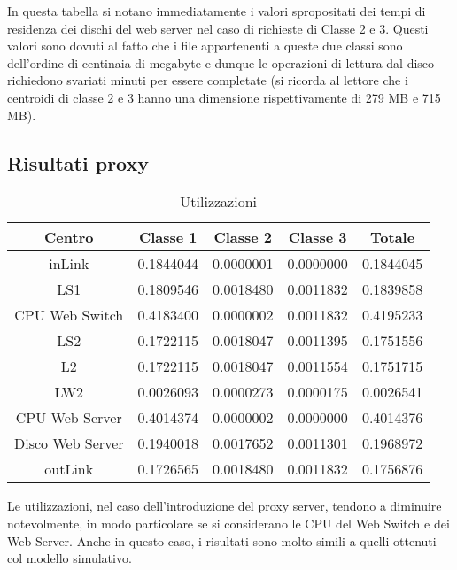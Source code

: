In questa tabella si notano immediatamente i valori spropositati dei tempi di residenza dei dischi del web server nel caso di richieste di Classe 2 e 3. Questi valori sono dovuti al fatto che i file appartenenti a queste due classi sono dell'ordine di centinaia di megabyte e dunque le operazioni di lettura dal disco richiedono svariati minuti per essere completate (si ricorda al lettore che i centroidi di classe 2 e 3 hanno una dimensione rispettivamente di 279 MB e 715 MB).

\subsection{Risultati proxy}
\begin{table}[htbp]
\begin{center}
\begin{tabular}{|c|c|c|c|c|}
\hline
Centro	&Classe 1	&Classe 2	&Classe 3 &Totale\\
\hline
\hline
inLink & 0.1844044 & 0.0000001 & 0.0000000 & 0.1844045 \\ \hline
LS1 & 0.1809546 & 0.0018480 & 0.0011832 & 0.1839858 \\ \hline
CPU Web Switch & 0.4183400 & 0.0000002 & 0.0011832 & 0.4195233 \\ \hline
LS2 & 0.1722115 & 0.0018047 & 0.0011395 & 0.1751556 \\ \hline
L2 & 0.1722115 & 0.0018047 & 0.0011554 & 0.1751715 \\ \hline
LW2 & 0.0026093 & 0.0000273 & 0.0000175 & 0.0026541 \\ \hline
CPU Web Server & 0.4014374 & 0.0000002 & 0.0000000 & 0.4014376 \\ \hline
Disco Web Server & 0.1940018 & 0.0017652 & 0.0011301 & 0.1968972 \\ \hline
outLink & 0.1726565 & 0.0018480 & 0.0011832 & 0.1756876 \\ \hline
\end{tabular}
\end{center}
\caption{Utilizzazioni}
\label{utilizzazioni}
\end{table}
Le utilizzazioni, nel caso dell'introduzione del proxy server, tendono a diminuire notevolmente, in modo particolare se si considerano le CPU del Web Switch e dei Web Server. Anche in questo caso, i risultati sono molto simili a quelli ottenuti col modello simulativo.
